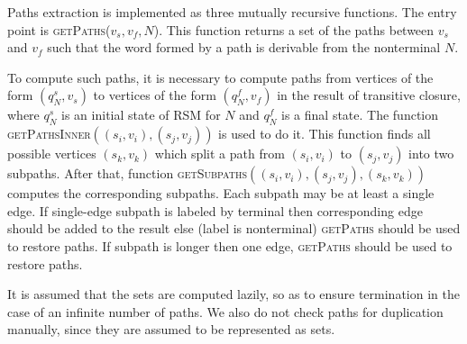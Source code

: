 Paths extraction is implemented as three mutually recursive functions.
The entry point is \textsc{getPaths}($v_s, v_f, N$).
This function returns a set of the paths between $v_s$ and $v_f$ such that the word formed by a path is derivable from the nonterminal $N$.

To compute such paths, it is necessary to compute paths from vertices of the form $(q_N^s,v_s)$ to vertices of the form $(q_N^f, v_f)$ in the result of transitive closure, where $q_N^s$ is an initial state of RSM for $N$ and $q_N^f$ is a final state.
The function \textsc{getPathsInner}$((s_i,v_i),(s_j,v_j))$ is used to do it.
This function finds all possible vertices $(s_k,v_k)$  which split a path from $(s_i,v_i)$ to $(s_j,v_j)$ into two subpaths.
After that, function \textsc{getSubpaths}$((s_i,v_i),(s_j,v_j),(s_k,v_k))$ computes the corresponding subpaths.
Each subpath may be at least a single edge.
If single-edge subpath is labeled by terminal then corresponding edge should be added to the result else (label is nonterminal) \textsc{getPaths} should be used to restore paths.
If subpath is longer then one edge, \textsc{getPaths} should be used to restore paths. 

It is assumed that the sets are computed lazily, so as to ensure termination in the case of an infinite number of paths.
We also do not check paths for duplication manually, since they are assumed to be represented as sets.